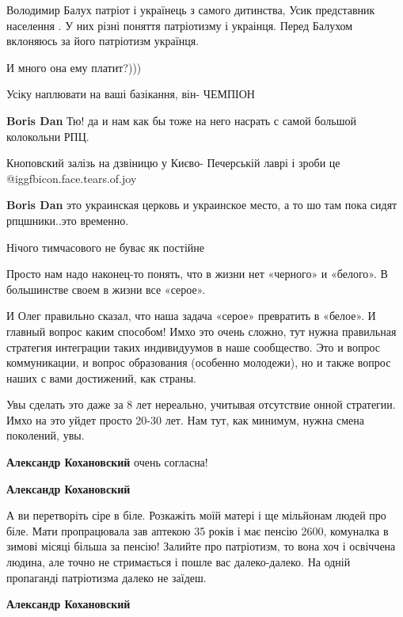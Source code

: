 \begin{itemize}
\begin{itemize}
Володимир Балух патріот і українець з самого дитинства, Усик представник населення . У них різні поняття патріотизму і украінця. Перед Балухом вклоняюсь за його патріотизм українця.

И много она ему платит?)))

Усіку наплювати на ваші базікання, він- ЧЕМПІОН

\textbf{Boris Dan} Тю! да и нам как бы тоже на него насрать с самой большой колокольни РПЦ.

Кноповский залізь на дзвіницю у Києво- Печерській лаврі і зроби це @igg{fbicon.face.tears.of.joy} 

\textbf{Boris Dan} это украинская церковь и украинское место, а то шо там пока сидят рпцшники..это временно.

Нічого тимчасового не буває як постійне

\end{itemize} %


Просто нам надо наконец-то понять, что в жизни нет «черного» и «белого». В
большинстве своем в жизни все «серое».

И Олег правильно сказал, что наша задача «серое» превратить в «белое». И
главный вопрос каким способом! Имхо это очень сложно, тут нужна правильная
стратегия интеграции таких индивидуумов в наше сообщество. Это и вопрос
коммуникации, и вопрос образования (особенно молодежи), но и также вопрос наших
с вами достижений, как страны.

Увы сделать это даже за 8 лет нереально, учитывая отсутствие онной стратегии.
Имхо на это уйдет просто 20-30 лет. Нам тут, как минимум, нужна смена
поколений, увы.

\begin{itemize} %
\textbf{Александр Кохановский} очень согласна!

\textbf{Александр Кохановский} 

А ви перетворіть сіре в біле. Розкажіть моїй матері і ще мільйонам людей про
біле. Мати пропрацювала зав аптекою 35 років і має пенсію 2600, комуналка в
зимові місяці більша за пенсію! Залийте про патріотизм, то вона хоч і освіччена
людина, але точно не стримається і пошле вас далеко-далеко. На одній пропаганді
патріотизма далеко не заїдеш.


\textbf{Александр Кохановский} 


\end{itemize}
\end{itemize}
